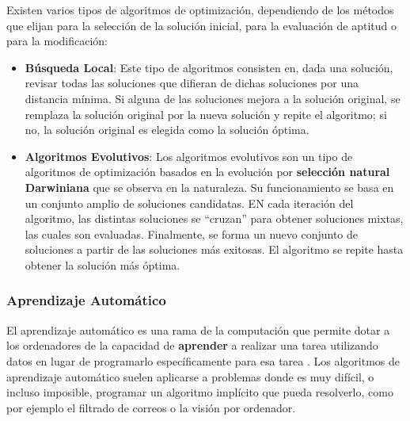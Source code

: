 Existen varios tipos de algoritmos de optimización, dependiendo de los métodos que elijan para la selección de la solución inicial, para la evaluación de aptitud o para la modificación:
\begin{itemize}
\item \textbf{Búsqueda Local}: Este tipo de algoritmos consisten en, dada una solución, revisar todas las soluciones que difieran de dichas soluciones por una distancia mínima. Si alguna de las soluciones mejora a la solución original, se remplaza la solución original por la nueva solución y repite el algoritmo; si no, la solución original es elegida como la solución óptima.
\item \textbf{Algoritmos Evolutivos}: Los algoritmos evolutivos son un tipo de algoritmos de optimización basados en la evolución por \textbf{selección natural Darwiniana} que se observa en la naturaleza. Su funcionamiento se basa en un conjunto amplio de soluciones candidatas. EN cada iteración del algoritmo, las distintas soluciones se ``cruzan'' para obtener soluciones mixtas, las cuales son evaluadas. Finalmente, se forma un nuevo conjunto de soluciones a partir de las soluciones más exitosas. El algoritmo se repite hasta obtener la solución más óptima.
\end{itemize} 

\subsubsection{Aprendizaje Automático}
El aprendizaje automático es una rama de la computación que permite dotar a los ordenadores de la capacidad de \textbf{aprender} a realizar una tarea utilizando datos en lugar de programarlo específicamente para esa tarea \cite{machine_learning}. Los algoritmos de aprendizaje automático suelen aplicarse a problemas donde es muy difícil, o incluso imposible, programar un algoritmo implícito que pueda resolverlo, como por ejemplo el filtrado de correos o la visión por ordenador.

